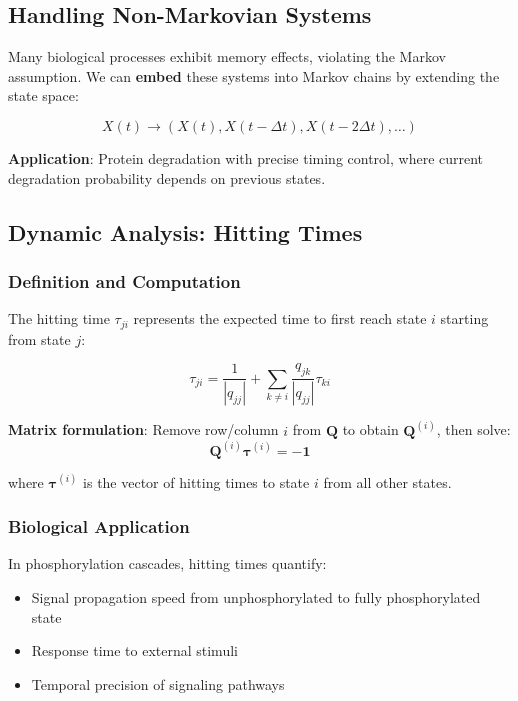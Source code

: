 \documentclass[12pt]{article}
\begin{document}
\subsection{Handling Non-Markovian Systems}

Many biological processes exhibit memory effects, violating the Markov assumption. We can \textbf{embed} these systems into Markov chains by extending the state space:

\begin{equation}
    X(t) \rightarrow (X(t), X(t-\Delta t), X(t-2\Delta t), \dots)
\end{equation}

\textbf{Application}: Protein degradation with precise timing control, where current degradation probability depends on previous states.

\subsection{Dynamic Analysis: Hitting Times}

\subsubsection{Definition and Computation}

The hitting time $\tau_{ji}$ represents the expected time to first reach state $i$ starting from state $j$:

\begin{equation}
    \tau_{ji} = \frac{1}{|q_{jj}|} + \sum_{k \neq i} \frac{q_{jk}}{|q_{jj}|} \tau_{ki}
\end{equation}

\textbf{Matrix formulation}: Remove row/column $i$ from $\mathbf{Q}$ to obtain $\mathbf{Q}^{(i)}$, then solve:
\begin{equation}
    \mathbf{Q}^{(i)} \boldsymbol{\tau}^{(i)} = -\mathbf{1}
\end{equation}

where $\boldsymbol{\tau}^{(i)}$ is the vector of hitting times to state $i$ from all other states.

\subsubsection{Biological Application}

In phosphorylation cascades, hitting times quantify:
\begin{itemize}
    \item Signal propagation speed from unphosphorylated to fully phosphorylated state
    \item Response time to external stimuli
    \item Temporal precision of signaling pathways
\end{itemize}
\end{document}
